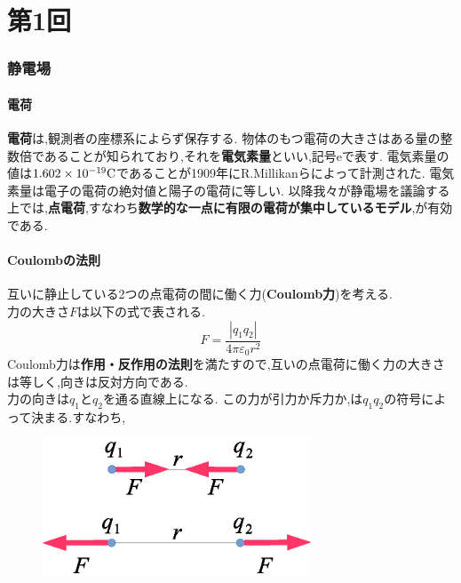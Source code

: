 \documentclass[../main]{subfiles}
\begin{document}
\part*{第1回}

\section{静電場}

\subsection{電荷}

{\bf 電荷}は,観測者の座標系によらず保存する.
物体のもつ電荷の大きさはある量の整数倍であることが知られており,それを{\bf 電気素量}といい,記号eで表す.
電気素量の値は$1.602 \times 10^{-19}{\rm C}$であることが1909年にR.Millikanらによって計測された.
電気素量は電子の電荷の絶対値と陽子の電荷に等しい.
以降我々が静電場を議論する上では,{\bf 点電荷},すなわち{\bf 数学的な一点に有限の電荷が集中しているモデル},が有効である.

\subsection{Coulombの法則}


互いに静止している2つの点電荷の間に働く力({\bf Coulomb力})を考える.\\
力の大きさ$F$は以下の式で表される.\\
\begin{equation}
F=\frac{|q_{1}q_{2}|}{4\pi \varepsilon_{0} r^2}
\end{equation}
Coulomb力は{\bf 作用・反作用の法則}を満たすので,互いの点電荷に働く力の大きさは等しく,向きは反対方向である.\\
力の向きは$q_{1}$と$q_{2}$を通る直線上になる.
この力が引力か斥力か,は$q_1q_2$の符号によって決まる.すなわち,

\begin{figure}[htbp]
 \begin{center}
  \includegraphics[width=80mm]{1.1.eps}
 \end{center}
 \caption{}
 \label{fig:one}
\end{figure}
\end{document}
